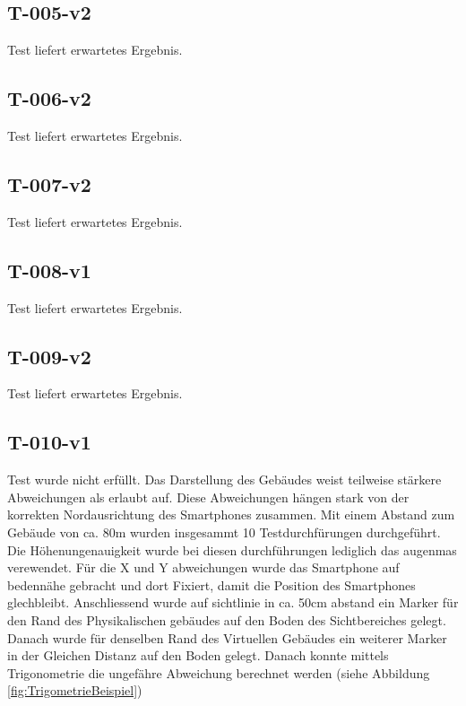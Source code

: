 \documentclass[a4paper]{scrreprt}
\begin{document}
\subsection{T-005-v2}
Test liefert erwartetes Ergebnis.
\subsection{T-006-v2}
Test liefert erwartetes Ergebnis.
\subsection{T-007-v2}
Test liefert erwartetes Ergebnis.
\subsection{T-008-v1}
Test liefert erwartetes Ergebnis.
\subsection{T-009-v2}
Test liefert erwartetes Ergebnis.
\subsection{T-010-v1}
Test wurde nicht erfüllt.
Das Darstellung des Gebäudes weist teilweise stärkere Abweichungen als erlaubt auf. Diese Abweichungen hängen stark von der korrekten Nordausrichtung des Smartphones zusammen.
Mit einem Abstand zum Gebäude von ca. 80m wurden insgesammt 10 Testdurchfürungen durchgeführt. Die Höhenungenauigkeit wurde bei diesen durchführungen lediglich das augenmas verewendet. Für die X und Y abweichungen wurde das Smartphone auf bedennähe gebracht und dort Fixiert, damit die Position des Smartphones glechbleibt. Anschliessend wurde auf sichtlinie in ca. 50cm abstand ein Marker für den Rand des Physikalischen gebäudes auf den Boden des Sichtbereiches gelegt. Danach wurde für denselben Rand des Virtuellen Gebäudes ein weiterer Marker in der Gleichen Distanz auf den Boden gelegt. Danach konnte mittels Trigonometrie die ungefähre Abweichung berechnet werden (siehe Abbildung \ref{fig:TrigometrieBeispiel})
\end{document}
